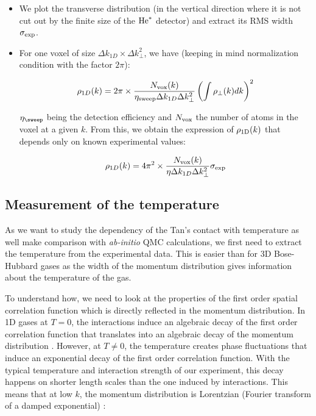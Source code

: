 \begin{itemize}
    \item We plot the transverse distribution (in the vertical direction where it is not cut out by the finite size of the $\mathrm{He}^*$ detector) and extract its RMS width $\sigma_{\rm{exp}}$.
    \item For one voxel of size $\Delta k_{1D} \times \Delta k_{\perp}^2$, we have (keeping in mind normalization condition with the factor $2\pi$):
    

    \begin{align}
        \rho_{1D}(k) &= 2\pi \times \frac{N_{\rm{vox}}(k)}{\eta_{\rm{sweep}} \Delta k_{1D} \Delta k_{\perp}^2} \left(\int \rho_{\perp}(k) dk \right)^2 \\
    \end{align}
    
    \noindent $\eta_{\rm{\sweep}}$ being the detection efficiency and $N_{\rm{vox}}$ the number of atoms in the voxel at a given $k$. From this, we obtain the expression of $\rho_{\rm{1D}}(k)$ that depends only on known experimental values:
    
    \begin{equation}
        \rho_{1D}(k) = 4\pi^2 \times \frac{N_{\rm{vox}}(k)}{\eta \Delta k_{1D} \Delta k_{\perp}^2} \sigma_{\rm{exp}} 
    \end{equation}

    

\end{itemize}



\subsection{Measurement of the temperature}

\label{sec:1D_temperature}

As we want to study the dependency of the Tan's contact with temperature as well make comparison with {\it ab-initio} QMC calculations, we first need to extract the temperature from the experimental data. This is easier than for 3D Bose-Hubbard gases as the width of the momentum distribution gives information about the temperature of the gas. 

To understand how, we need to look at the properties of the first order spatial correlation function which is directly reflected in the momentum distribution. In 1D gases at $T=0$, the interactions induce an algebraic decay of the first order correlation function that translates into an algebraic decay of the momentum distribution \cite{gangardt2003stability,pitaevskii1991}. However, at $T \neq 0$, the temperature creates phase fluctuations that induce an exponential decay of the first order correlation function. With the typical temperature and interaction strength of our experiment, this decay happens on shorter length scales than the one induced by interactions. This means that at low $k$, the momentum distribution is Lorentzian (Fourier transform of a damped exponential) \cite{cazalilla2004bosonizing,fabbri2011momentum,gerbier2004condensat}:

